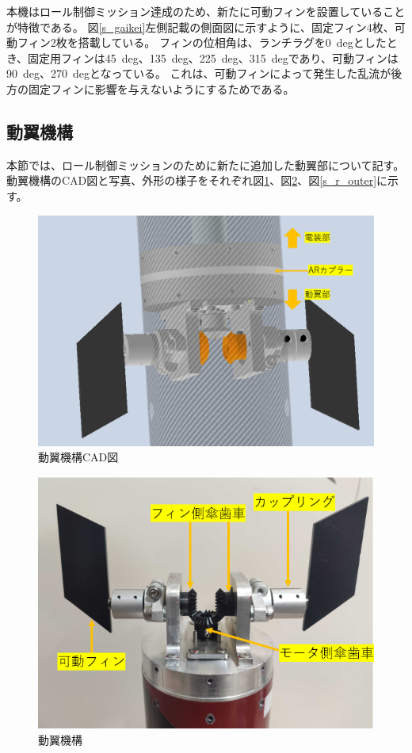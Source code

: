 \documentclass[a4paper,11pt,uplatex]{jsarticle}
\begin{document}
本機はロール制御ミッション達成のため、新たに可動フィンを設置していることが特徴である。
図\ref{s_gaikei}左側記載の側面図に示すように、固定フィン4枚、可動フィン2枚を搭載している。
フィンの位相角は、ランチラグを\SI{0}{deg}としたとき、固定用フィンは\SI{45}{deg}、\SI{135}{deg}、\SI{225}{deg}、\SI{315}{deg}であり、可動フィンは\SI{90}{deg}、\SI{270}{deg}となっている。
これは、可動フィンによって発生した乱流が後方の固定フィンに影響を与えないようにするためである。

\subsection{動翼機構}
\label{douyoku}
本節では、ロール制御ミッションのために新たに追加した動翼部について記す。
動翼機構のCAD図と写真、外形の様子をそれぞれ図\ref{s_r_all}、図\ref{s_r_pic}、図\ref{s_r_outer}に示す。

\begin{figure}[H]
	\centering
	\includegraphics[scale = 0.3]{pic_str/s_roll_all.png}
	\caption{動翼機構CAD図}
	\label{s_r_all}
\end{figure}

\begin{figure}[H]
	\centering
	\includegraphics[scale = 0.6]{pic_str/s_r_pic.png}
	\caption{動翼機構}
	\label{s_r_pic}
\end{figure}
\end{document}
